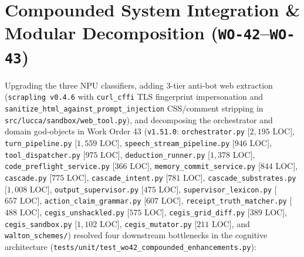 \documentclass[11pt,a4paper]{article}
\begin{document}
\section{Compounded System Integration \& Modular Decomposition (\texttt{WO-42}--\texttt{WO-43})}
\label{sec:compounded}
Upgrading the three NPU classifiers, adding 3-tier anti-bot web extraction (\texttt{scrapling v0.4.6} with \texttt{curl\_cffi} TLS fingerprint impersonation and \texttt{sanitize\_html\_against\_prompt\_injection} CSS/comment stripping in \texttt{src/lucca/sandbox/web\_tool.py}), and decomposing the orchestrator and domain god-objects in Work Order 43 (\texttt{v1.51.0}: \texttt{orchestrator.py} [$2{,}195\text{ LOC}$], \texttt{turn\_pipeline.py} [$1{,}559\text{ LOC}$], \texttt{speech\_stream\_pipeline.py} [$946\text{ LOC}$], \texttt{tool\_dispatcher.py} [$975\text{ LOC}$], \texttt{deduction\_runner.py} [$1{,}378\text{ LOC}$], \texttt{code\_preflight\_service.py} [$366\text{ LOC}$], \texttt{memory\_commit\_service.py} [$844\text{ LOC}$], \texttt{cascade.py} [$775\text{ LOC}$], \texttt{cascade\_intent.py} [$781\text{ LOC}$], \texttt{cascade\_substrates.py} [$1{,}008\text{ LOC}$], \texttt{output\_supervisor.py} [$475\text{ LOC}$], \texttt{supervisor\_lexicon.py} [$657\text{ LOC}$], \texttt{action\_claim\_grammar.py} [$607\text{ LOC}$], \texttt{receipt\_truth\_matcher.py} [$488\text{ LOC}$], \texttt{cegis\_unshackled.py} [$575\text{ LOC}$], \texttt{cegis\_grid\_diff.py} [$389\text{ LOC}$], \texttt{cegis\_sandbox.py} [$1{,}102\text{ LOC}$], \texttt{cegis\_mutator.py} [$211\text{ LOC}$], and \texttt{walton\_schemes/}) resolved four downstream bottlenecks in the cognitive architecture (\texttt{tests/unit/test\_wo42\_compounded\_enhancements.py}):
\end{document}
